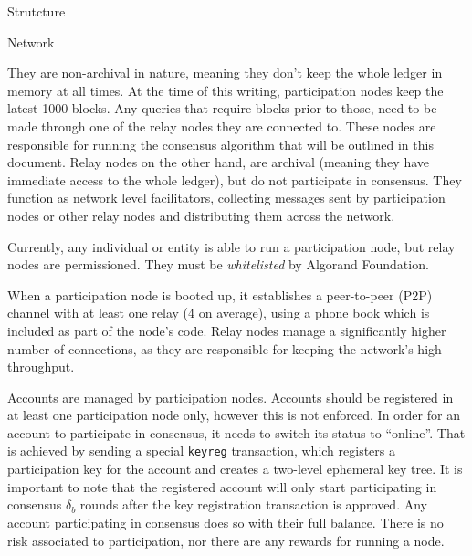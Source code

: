 \documentclass[10pt,a4paper]{article}
\begin{document}
\begin{section}{Strutcture}
\begin{subsection}{Network}

They are non-archival in nature, meaning they don't keep
the whole ledger in memory at all times. At the time of this writing,
participation nodes keep the latest 1000 blocks.
Any queries that require blocks prior to those, need to be made
through one of the relay nodes they are connected to.
These nodes are responsible for running the consensus algorithm that
will be outlined in this document.
Relay nodes on the other hand, are archival (meaning they have immediate
access to the whole ledger), but do not participate in consensus.
They function as network level facilitators, collecting messages sent by participation
nodes or other relay nodes and distributing them across the network.

Currently, any individual or entity is able to run a participation node, 
but relay nodes are permissioned. They must be {\em whitelisted} by 
Algorand Foundation.

When a participation node is booted up, it establishes a peer-to-peer (P2P) 
channel with at least one relay (4 on average), using a phone book which is included
as part of the node's code. 
Relay nodes manage a significantly higher number of connections, as they 
are responsible for keeping the network's high throughput.

Accounts are managed by participation nodes. Accounts should be registered in at least one participation
node only, however this is not enforced.
In order for an account to participate in consensus, it needs to switch its status to ``online''. 
That is achieved by sending a special {\tt keyreg} transaction,
which registers a participation key for the account and creates a two-level ephemeral key tree.
It is important to note that the registered account will only start participating in consensus
$\delta_b$ rounds after the key registration transaction is approved.
Any account participating in consensus does so with their full balance. There is no risk
associated to participation, nor there are any rewards for running a node.



\end{subsection}
\end{section}
\end{document}

